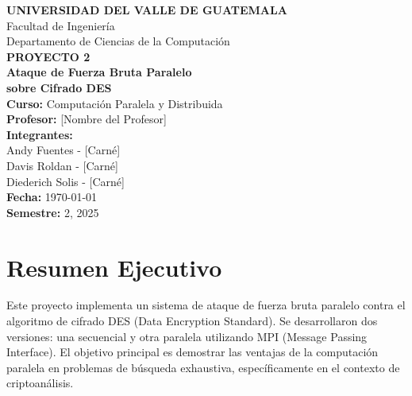 \documentclass[12pt,letterpaper]{article}
\begin{document}
\begin{titlepage}
    \centering
    
    
    {\LARGE \textbf{UNIVERSIDAD DEL VALLE DE GUATEMALA}}\\[0.5cm]
    {\Large Facultad de Ingeniería}\\[0.3cm]
    {\large Departamento de Ciencias de la Computación}\\[1.5cm]
    
    {\huge \textbf{PROYECTO 2}}\\[0.5cm]
    {\LARGE \textbf{Ataque de Fuerza Bruta Paralelo}}\\[0.3cm]
    {\LARGE \textbf{sobre Cifrado DES}}\\[1.5cm]
    
    {\large \textbf{Curso:} Computación Paralela y Distribuida}\\[0.3cm]
    {\large \textbf{Profesor:} [Nombre del Profesor]}\\[1cm]
    
    {\large \textbf{Integrantes:}}\\[0.2cm]
    {\large Andy Fuentes - [Carné]}\\
    {\large Davis Roldan - [Carné]}\\
    {\large Diederich Solis - [Carné]}\\[1.5cm]
    
    {\large \textbf{Fecha:} \today}\\[0.5cm]
    {\large \textbf{Semestre:} 2, 2025}
    
    \vfill
\end{titlepage}

\tableofcontents
\newpage

\listoffigures
\listoftables
\newpage

\section{Resumen Ejecutivo}

Este proyecto implementa un sistema de ataque de fuerza bruta paralelo contra el algoritmo de cifrado DES (Data Encryption Standard). Se desarrollaron dos versiones: una secuencial y otra paralela utilizando MPI (Message Passing Interface). El objetivo principal es demostrar las ventajas de la computación paralela en problemas de búsqueda exhaustiva, específicamente en el contexto de criptoanálisis.
\end{document}
